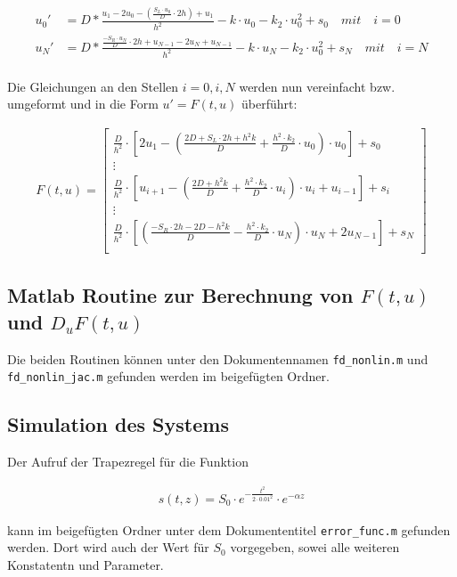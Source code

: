 \documentclass[
	pagesize,
	fontsize=12pt,
	paper=a4,
	oneside,
   reqno
]{scrartcl}
\begin{document}
\begin{align*}
   u_0' &= D*\frac{u_1-2u_0-(\frac{S_L \cdot u_0}{D}\cdot 2h)+u_1}{h^2} - k\cdot u_0 -k_2\cdot u_0^2 + s_0 \quad mit \quad i = 0 \\
   u_N' &= D*\frac{\frac{-S_R \cdot u_N}{D}\cdot 2h+u_{N-1}-2u_N+u_{N-1}}{h^2} - k\cdot u_N -k_2\cdot u_0^2 + s_N \quad mit \quad i = N \\
\end{align*}

Die Gleichungen an den Stellen $i=0, i, N$ werden nun vereinfacht bzw. umgeformt und in die Form $u' = F(t,u)$ überführt:

\begin{align*}
   F(t,u) =
   \begin{bmatrix}
      \frac{D}{h^2}\cdot \left[ 2u_1-\left( \frac{2D+S_L\cdot 2h+h^2k}{D}+\frac{h^2\cdot k_2}{D}\cdot u_0\right) \cdot u_0\right] + s_0 \\
      \vdots \\
      \frac{D}{h^2}\cdot \left[ u_{i+1}-\left( \frac{2D+h^2k}{D}+\frac{h^2\cdot k_2}{D}\cdot u_i\right) \cdot u_i+u_{i-1}\right] + s_i \\
      \vdots \\
      \frac{D}{h^2}\cdot \left[ \left( \frac{-S_R\cdot 2h-2D-h^2k}{D}-\frac{h^2\cdot k_2}{D}\cdot u_N\right) \cdot u_N+2u_{N-1}\right] + s_N \\
   \end{bmatrix}
\end{align*}

\subsection{Matlab Routine zur Berechnung von $F(t,u)$ und $D_uF(t,u)$}

Die beiden Routinen können unter den Dokumentennamen \texttt{fd\_nonlin.m} und \texttt{fd\_nonlin\_jac.m} gefunden werden im beigefügten Ordner.

\subsection{Simulation des Systems}

Der Aufruf der Trapezregel für die Funktion

\begin{align*}
   s(t,z) = S_0 \cdot e^{-\frac{t^2}{2 \cdot 0.01^2}} \cdot e^{- \alpha z}
\end{align*}

kann im beigefügten Ordner unter dem Dokumententitel \texttt{error\_func.m} gefunden werden. Dort wird auch der Wert für $S_0$ vorgegeben, sowei alle weiteren Konstatentn und Parameter. \\
\end{document}
